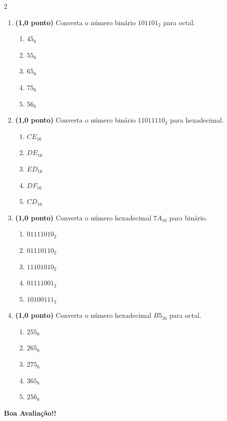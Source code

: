 \documentclass[a4paper,12pt]{article}
\begin{document}
\begin{multicols}{2}
\begin{enumerate}[leftmargin=*]
\vspace{0.2cm}

\item \textbf{(1,0 ponto)} Converta o número binário $101101_2$ para octal.

\begin{enumerate}[label=(\Alph*)]
    \item $45_8$
    \item $55_8$
    \item $65_8$
    \item $75_8$
    \item $56_8$
\end{enumerate}

\vspace{0.2cm}

\item \textbf{(1,0 ponto)} Converta o número binário $11011110_2$ para hexadecimal.

\begin{enumerate}[label=(\Alph*)]
    \item $CE_{16}$
    \item $DE_{16}$
    \item $ED_{16}$
    \item $DF_{16}$
    \item $CD_{16}$
\end{enumerate}

\vspace{0.2cm}

\item \textbf{(1,0 ponto)} Converta o número hexadecimal $7A_{16}$ para binário.

\begin{enumerate}[label=(\Alph*)]
    \item $01111010_2$
    \item $01110110_2$
    \item $11101010_2$
    \item $01111001_2$
    \item $10100111_2$
\end{enumerate}

\vspace{0.2cm}

\item \textbf{(1,0 ponto)} Converta o número hexadecimal $B5_{16}$ para octal.

\begin{enumerate}[label=(\Alph*)]
    \item $255_8$
    \item $265_8$
    \item $275_8$
    \item $365_8$
    \item $256_8$
\end{enumerate}

\end{enumerate}

\end{multicols}

\vfill

\begin{center}
\textbf{Boa Avaliação!!}
\end{center}
\end{document}
